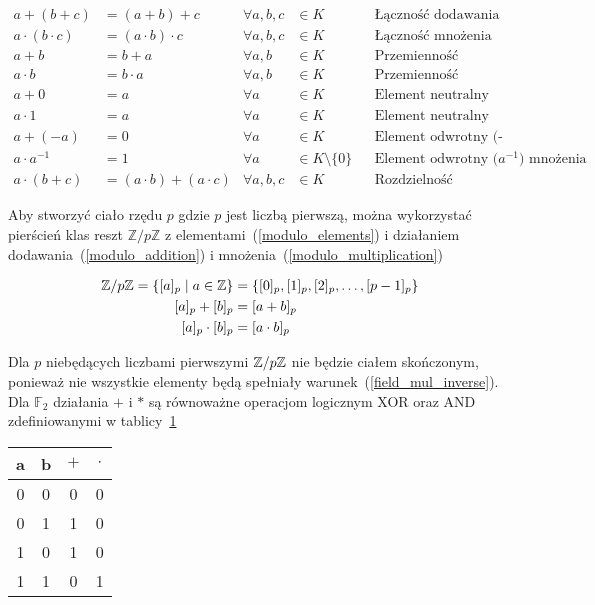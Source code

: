 {\small
    \begin{align}
        a + (b + c) &= (a + b) + c & \forall a,b,c &\in K && \text{Łączność dodawania} \\
        a \cdot (b \cdot c) &= (a \cdot b) \cdot c & \forall a,b,c &\in K && \text{Łączność mnożenia} \\
        a + b &= b + a & \forall a,b &\in K && \text{Przemienność dodawania} \\
        a \cdot b &= b \cdot a & \forall a,b &\in K && \text{Przemienność mnożenia} \\
        a + 0 &= a & \forall a &\in K && \text{Element neutralny (0) dodawania} \\
        a \cdot 1 &= a & \forall a &\in K && \text{Element neutralny (1) mnożenia} \\
        a + (-a) &= 0 & \forall a &\in K && \text{Element odwrotny (-a) dodawania} \\
        a \cdot a^{-1} &= 1 & \forall a &\in K \setminus \{ 0 \} &&
            \text{Element odwrotny (} a^{-1} \text{) mnożenia} \label{field_mul_inverse}\\
        a \cdot (b + c) &= (a \cdot b) + (a \cdot c) & \forall a,b,c &\in K &&
            \text{Rozdzielność mnożenia względem dodawania}
    \end{align}
}%

Aby stworzyć ciało rzędu $p$ gdzie $p$ jest liczbą pierwszą, można wykorzystać
pierścień klas reszt $\mathbb{Z} / p \mathbb{Z}$ z elementami~(\ref{modulo_elements})
i działaniem dodawania~(\ref{modulo_addition}) i mnożenia~(\ref{modulo_multiplication})

\begin{align}
    \mathbb{Z} / p \mathbb{Z} = \{ [a]_p \; | \; a \in \mathbb{Z} \} &= \{ [0]_p, [1]_p,
    [2]_p, \ldots, [p-1]_p \} \label{modulo_elements} \\
    [a]_p + [b]_p &= [a + b]_p \label{modulo_addition} \\
    [a]_p \cdot [b]_p &= [a \cdot b]_p \label{modulo_multiplication}
\end{align}

Dla $p$ niebędących liczbami pierwszymi $\mathbb{Z} / p \mathbb{Z}$ nie będzie
ciałem skończonym, ponieważ nie wszystkie elementy będą spełniały
warunek~(\ref{field_mul_inverse}).
Dla $\mathbb{F}_2$ działania $+$ i $*$ są równoważne operacjom logicznym XOR
oraz AND zdefiniowanymi w tablicy~\ref{truth_table:title}
\begin{table}[H]
    \label{truth_table:title}
    \centering
    \begin{tabular}{c c | c c}
        \toprule
        a & b & $+$ & $\cdot$ \\
        \midrule
        0 & 0 & 0 & 0 \\
        \midrule
        0 & 1 & 1 & 0 \\
        \midrule
        1 & 0 & 1 & 0 \\
        \midrule
        1 & 1 & 0 & 1 \\
        \bottomrule
    \end{tabular}
\end{table}

